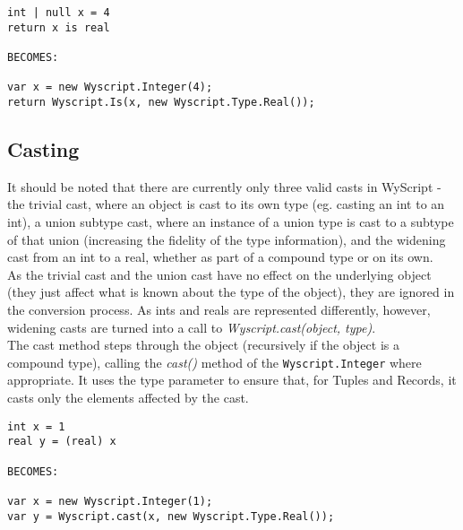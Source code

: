 \begin{lstlisting}
int | null x = 4
return x is real

BECOMES:

var x = new Wyscript.Integer(4);
return Wyscript.Is(x, new Wyscript.Type.Real()); 
\end{lstlisting}

\subsection{Casting}
\label{c_functions_casting}

It should be noted that there are currently only three valid casts in WyScript - the trivial cast, where an object is cast to its own type (eg. casting an int to an int), a union subtype cast, where an instance of a union type is cast to a subtype of that union (increasing the fidelity of the type information), and the widening cast from an int to a real, whether as part of a compound type or on its own.\\

As the trivial cast and the union cast have no effect on the underlying object (they just affect what is known about the type of the object), they are ignored in the conversion process. As ints and reals are represented differently, however, widening casts are turned into a call to {\em Wyscript.cast(object, type)}.\\

The cast method steps through the object (recursively if the object is a compound type), calling the {\em cast()} method of the \lstinline{Wyscript.Integer} where appropriate. It uses the type parameter to ensure that, for Tuples and Records, it casts only the elements affected by the cast.

\pagebreak
\begin{lstlisting}
int x = 1
real y = (real) x

BECOMES:

var x = new Wyscript.Integer(1);
var y = Wyscript.cast(x, new Wyscript.Type.Real());
\end{lstlisting}

